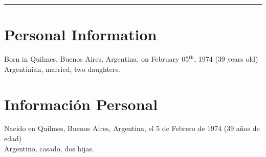 \hrule
\ifeng
\section*{Personal Information}
Born in Quilmes, Buenos Aires, Argentina, on February 05$^\mathrm{th}$, 1974 (39 years old)\\
Argentinian, married, two daughters.
\else
\section*{Información Personal}
Nacido en Quilmes, Buenos Aires, Argentina, el 5 de Febrero de 1974 (39 años de edad)\\
Argentino, casado, dos hijas.
\fi
